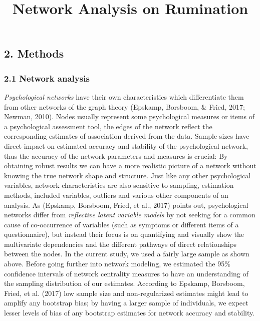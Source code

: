 \documentclass[
]{article}
\title{Network Analysis on Rumination}
\author{}
\date{\vspace{-2.5em}}
\begin{document}
\maketitle

{
\setcounter{tocdepth}{2}
\tableofcontents
}
\hypertarget{methods}{%
\subsection{2. Methods}\label{methods}}

\hypertarget{network-analysis}{%
\subsubsection{2.1 Network analysis}\label{network-analysis}}

\emph{Psychological networks} have their own characteristics which
differentiate them from other networks of the graph theory (Epskamp,
Borsboom, \& Fried, 2017; Newman, 2010). Nodes usually represent some
psychological measures or items of a psychological assessment tool, the
edges of the network reflect the corresponding estimates of association
derived from the data. Sample sizes have direct impact on estimated
accuracy and stability of the psychological network, thus the accuracy
of the network parameters and measures is crucial: By obtaining robust
results we can have a more realistic picture of a network without
knowing the true network shape and structure. Just like any other
psychological variables, network characteristics are also sensitive to
sampling, estimation methods, included variables, outliers and various
other components of an analysis. As (Epskamp, Borsboom, Fried, et al.,
2017) points out, psychological networks differ from \emph{reflective
latent variable models} by not seeking for a common cause of
co-occurrence of variables (such as symptoms or different items of a
questionnaire), but instead their focus is on quantifying and visually
show the multivariate dependencies and the different pathways of direct
relationships between the nodes. In the current study, we used a fairly
large sample as shown above. Before going further into network modeling,
we estimated the 95\% confidence intervals of network centrality
measures to have an understanding of the sampling distribution of our
estimates. According to Epskamp, Borsboom, Fried, et al. (2017) low
sample size and non-regularized estimates might lead to amplify any
bootstrap bias; by having a larger sample of individuals, we expect
lesser levels of bias of any bootstrap estimates for network accuracy
and stability.
\end{document}
